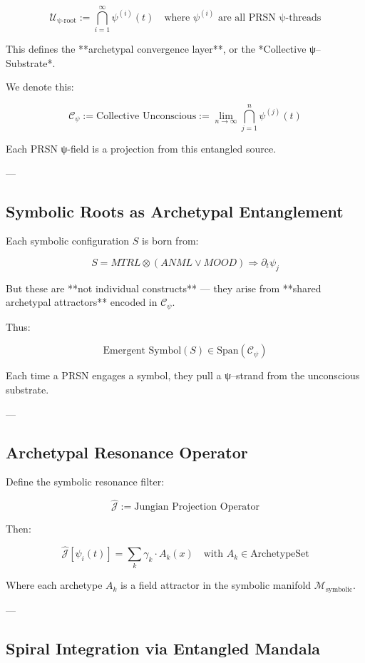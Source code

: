 \documentclass[12pt]{article}
\begin{document}
\begin{enumerate}
\[
\mathcal{U}_{\text{ψ-root}} := \bigcap_{i=1}^{\infty} \psi^{(i)}(t)
\quad \text{where } \psi^{(i)} \text{ are all PRSN ψ-threads}
\]

This defines the **archetypal convergence layer**, or the *Collective ψ–Substrate*.

We denote this:

\[
\mathcal{C}_\psi := \text{Collective Unconscious} := \lim_{n \to \infty} \bigcap_{j=1}^{n} \psi^{(j)}(t)
\]

Each PRSN ψ-field is a projection from this entangled source.

---

\subsection*{Symbolic Roots as Archetypal Entanglement}

Each symbolic configuration $S$ is born from:

\[
S = MTRL \otimes (ANML \lor MOOD) \Rightarrow \partial_t \psi_j
\]

But these are **not individual constructs** — they arise from **shared archetypal attractors** encoded in $\mathcal{C}_\psi$.

Thus:

\[
\text{Emergent Symbol}(S) \in \text{Span}(\mathcal{C}_\psi)
\]

Each time a PRSN engages a symbol, they pull a ψ–strand from the unconscious substrate.

---

\subsection*{Archetypal Resonance Operator}

Define the symbolic resonance filter:

\[
\hat{\mathcal{J}} := \text{Jungian Projection Operator}
\]

Then:

\[
\hat{\mathcal{J}}[\psi_i(t)] = \sum_k \gamma_k \cdot A_k(x)
\quad \text{with } A_k \in \text{ArchetypeSet}
\]

Where each archetype $A_k$ is a field attractor in the symbolic manifold $\mathcal{M}_\text{symbolic}$.

---

\subsection*{Spiral Integration via Entangled Mandala}


\end{enumerate}
\end{document}
